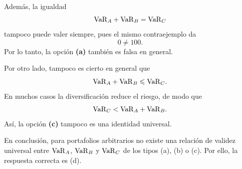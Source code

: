Además, la igualdad
\[
\mathrm{VaR}_A+\mathrm{VaR}_B=\mathrm{VaR}_C
\]
tampoco puede valer siempre, pues el mismo contraejemplo da
\[
0\neq 100.
\]
Por lo tanto, la opción \textbf{(a)} también es falsa en general.

Por otro lado, tampoco es cierto en general que
\[
\mathrm{VaR}_A+\mathrm{VaR}_B\leqslant \mathrm{VaR}_C.
\]
En muchos casos la diversificación reduce el riesgo, de modo que
\[
\mathrm{VaR}_C<\mathrm{VaR}_A+\mathrm{VaR}_B.
\]
Así, la opción \textbf{(c)} tampoco es una identidad universal.

En conclusión, para portafolios arbitrarios no existe una relación de validez
universal entre \(\mathrm{VaR}_A\), \(\mathrm{VaR}_B\) y \(\mathrm{VaR}_C\) de los tipos (a), (b) o (c).
Por ello, la respuesta correcta es (d).